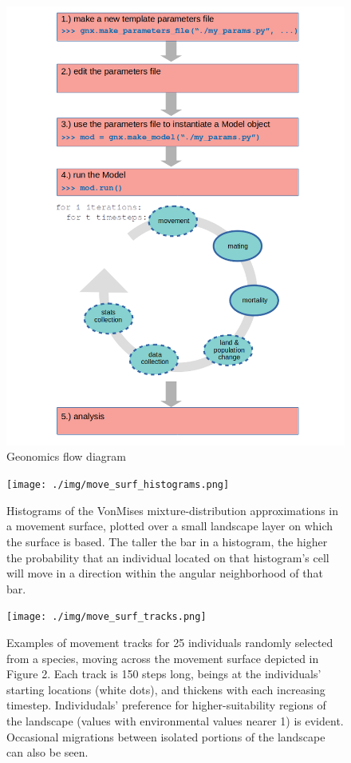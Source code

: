 ﻿\documentclass{article}
\begin{document}
\begin{figure}[h!]
\includegraphics[width=125mm]{./img/flow_diagram.png}
        \caption{Geonomics flow diagram}
        \label{fig:flow}
\end{figure}


\begin{figure}[h!]
\texttt{[image: ./img/move\_surf\_histograms.png]}
        \caption{Histograms of the VonMises mixture-distribution approximations in a movement surface, plotted over a small landscape layer on which the surface is based. The taller the bar in a histogram, the higher the probability that an individual located on that histogram's cell will move in a direction within the angular neighborhood of that bar.}
        \label{fig:move_surf_hists}
\end{figure}

\begin{figure}[h!]
\texttt{[image: ./img/move\_surf\_tracks.png]}
        \caption{Examples of movement tracks for 25 individuals randomly selected from a species, moving across the movement surface depicted in Figure 2. Each track is 150 steps long, beings at the individuals' starting locations (white dots), and thickens with each increasing timestep. Individudals' preference for higher-suitability regions of the landscape (values with environmental values nearer 1) is evident. Occasional migrations between isolated portions of the landscape can also be seen.}
        \label{fig:move_surf_tracks}
\end{figure}
\end{document}
